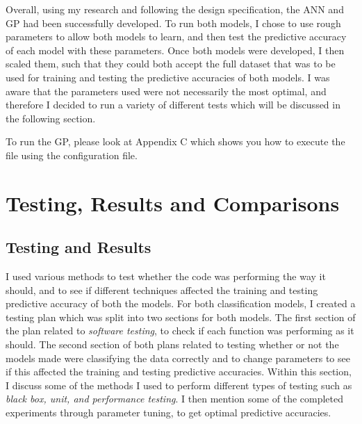 \documentclass[11pt]{article}
\begin{document}
Overall, using my research and following the design specification, the ANN and GP had been successfully developed. To run both models, I chose to use rough parameters to allow both models to learn, and then test the predictive accuracy of each model with these parameters. Once both models were developed, I then scaled them, such that they could both accept the full dataset that was to be used for training and testing the predictive accuracies of both models. I was aware that the parameters used were not necessarily the most optimal, and therefore I decided to run a variety of different tests which will be discussed in the following section.

To run the GP, please look at Appendix C which shows you how to execute the file using the configuration file. 
\section{Testing, Results and Comparisons} \label{sec:TRC}
\subsection{Testing and Results}\label{subsec:TnR}
I used various methods to test whether the code was performing the way it should, and to see if different techniques affected the training and testing predictive accuracy of both the models. For both classification models, I created a testing plan which was split into two sections for both models. The first section of the plan related to \textit{software testing}, to check if each function was performing as it should. The second section of both plans related to testing whether or not the models made were classifying the data correctly and to change parameters to see if this affected the training and testing predictive accuracies. Within this section, I discuss some of the methods I used to perform different types of testing such as \textit{\textit{black box}, unit, and performance testing}. I then mention some of the completed experiments through parameter tuning, to get optimal predictive accuracies. 
\end{document}
